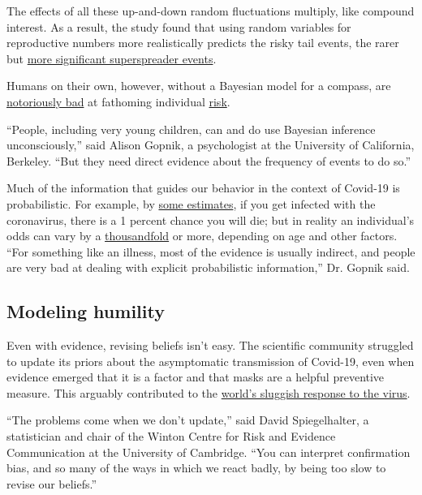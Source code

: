 The effects of all these up-and-down random fluctuations multiply, like
compound interest. As a result, the study found that using random
variables for reproductive numbers more realistically predicts the risky
tail events, the rarer but
\href{https://www.nytimes3xbfgragh.onion/2020/06/30/science/how-coronavirus-spreads.html}{more
significant superspreader events}.

Humans on their own, however, without a Bayesian model for a compass,
are \href{https://en.wikipedia.org/wiki/Prospect_theory}{notoriously
bad} at fathoming individual
\href{https://twitter.com/xkcdComic/status/1283437923421937666/photo/1}{risk}.

``People, including very young children, can and do use Bayesian
inference unconsciously,'' said Alison Gopnik, a psychologist at the
University of California, Berkeley. ``But they need direct evidence
about the frequency of events to do so.''

Much of the information that guides our behavior in the context of
Covid-19 is probabilistic. For example, by
\href{https://www.nature.com/articles/d41586-020-01738-2}{some
estimates}, if you get infected with the coronavirus, there is a 1
percent chance you will die; but in reality an individual's odds can
vary by a
\href{https://medium.com/wintoncentre/how-much-normal-risk-does-covid-represent-4539118e1196}{thousandfold}
or more, depending on age and other factors. ``For something like an
illness, most of the evidence is usually indirect, and people are very
bad at dealing with explicit probabilistic information,'' Dr. Gopnik
said.

\hypertarget{modeling-humility}{%
\subsection{Modeling humility}\label{modeling-humility}}

Even with evidence, revising beliefs isn't easy. The scientific
community struggled to update its priors about the asymptomatic
transmission of Covid-19, even when evidence emerged that it is a factor
and that masks are a helpful preventive measure. This arguably
contributed to the
\href{https://www.nytimes3xbfgragh.onion/2020/06/27/world/europe/coronavirus-spread-asymptomatic.html?action=click\&module=RelatedLinks\&pgtype=Article}{world's
sluggish response to the virus}.

``The problems come when we don't update,'' said David Spiegelhalter, a
statistician and chair of the Winton Centre for Risk and Evidence
Communication at the University of Cambridge. ``You can interpret
confirmation bias, and so many of the ways in which we react badly, by
being too slow to revise our beliefs.''

